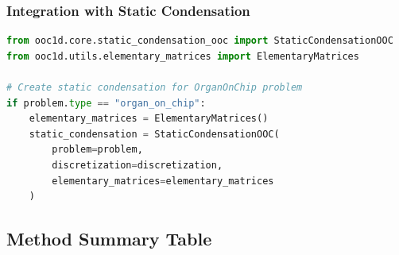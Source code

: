 \subsubsection{Integration with Static Condensation}

\begin{lstlisting}[language=Python, caption=Static Condensation Integration]
from ooc1d.core.static_condensation_ooc import StaticCondensationOOC
from ooc1d.utils.elementary_matrices import ElementaryMatrices

# Create static condensation for OrganOnChip problem
if problem.type == "organ_on_chip":
    elementary_matrices = ElementaryMatrices()
    static_condensation = StaticCondensationOOC(
        problem=problem,
        discretization=discretization,
        elementary_matrices=elementary_matrices
    )
\end{lstlisting}

\subsection{Method Summary Table}
\label{subsec:method_summary}


